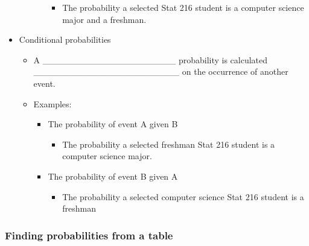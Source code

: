 \documentclass[
]{report}
\providecommand{\tightlist}{%
  \setlength{\itemsep}{0pt}\setlength{\parskip}{0pt}}
\begin{document}
\begin{itemize}
\begin{itemize}
\begin{itemize}
      \begin{itemize}
      \tightlist
      \item
        The probability a selected Stat 216 student is a computer science major and a freshman.
      \end{itemize}
    \end{itemize}
  \end{itemize}
\item
  Conditional probabilities

  \begin{itemize}
  \item
    A \_\_\_\_\_\_\_\_\_\_\_\_\_\_\_\_\_\_\_\_\_ probability is calculated
    \_\_\_\_\_\_\_\_\_\_\_\_\_\_\_\_\_\_\_\_\_\_\_ on the occurrence of another event.
  \item
    Examples:

    \begin{itemize}
    \item
      The probability of event A given B

      \begin{itemize}
      \tightlist
      \item
        The probability a selected freshman Stat 216 student is a computer science major.
      \end{itemize}
    \item
      The probability of event B given A

      \begin{itemize}
      \tightlist
      \item
        The probability a selected computer science Stat 216 student is a freshman
      \end{itemize}
    \end{itemize}
  \end{itemize}
\end{itemize}


\hypertarget{finding-probabilities-from-a-table}{%
\subsubsection*{Finding probabilities from a table}\label{finding-probabilities-from-a-table}}
\end{document}
